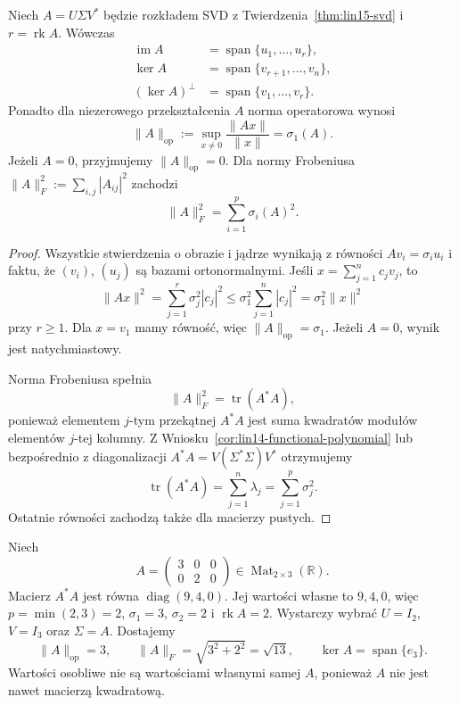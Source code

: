 \begin{stwierdzenie}
\label{prop:lin15-svd-rank}
Niech \(A=U\Sigma V^*\)
będzie rozkładem SVD
z
Twierdzenia~\ref{thm:lin15-svd}
i \(r=\operatorname{rk}A\).
Wówczas
\[
 \begin{aligned}
 \operatorname{im}A
   &=\operatorname{span}\{u_1,\ldots,u_r\},\\
 \ker A
   &=\operatorname{span}\{v_{r+1},\ldots,v_n\},\\
 (\ker A)^\perp
   &=\operatorname{span}\{v_1,\ldots,v_r\}.
 \end{aligned}
\]
Ponadto dla niezerowego
przekształcenia \(A\) norma
operatorowa wynosi
\[
 \|A\|_{\mathrm{op}}
 :=\sup_{x\ne0}\frac{\|Ax\|}{\|x\|}
 =\sigma_1(A).
\]
Jeżeli \(A=0\), przyjmujemy
\(\|A\|_{\mathrm{op}}=0\).
Dla normy Frobeniusa
\(\|A\|_F^2:=\sum_{i,j}|A_{ij}|^2\)
zachodzi
\[
 \|A\|_F^2
 =\sum_{i=1}^p\sigma_i(A)^2.
\]
\end{stwierdzenie}
\begin{proof}
Wszystkie stwierdzenia
o obrazie i jądrze wynikają
z równości \(Av_i=\sigma_i u_i\)
i faktu, że \((v_i)\),
\((u_j)\) są bazami ortonormalnymi.
Jeśli \(x=\sum_{j=1}^n c_jv_j\),
to
\[
 \|Ax\|^2
 =\sum_{j=1}^{r}\sigma_j^2|c_j|^2
 \le\sigma_1^2\sum_{j=1}^{n}|c_j|^2
 =\sigma_1^2\|x\|^2
\]
przy \(r\ge1\).
Dla \(x=v_1\) mamy równość,
więc \(\|A\|_{\mathrm{op}}=\sigma_1\).
Jeżeli \(A=0\), wynik
jest natychmiastowy.

Norma Frobeniusa spełnia
\[
 \|A\|_F^2
 =\operatorname{tr}(A^*A),
\]
ponieważ elementem \(j\)-tym
przekątnej \(A^*A\)
jest suma kwadratów modułów
elementów \(j\)-tej kolumny.
Z
Wniosku~\ref{cor:lin14-functional-polynomial}
lub bezpośrednio z diagonalizacji
\(A^*A=V(\Sigma^*\Sigma)V^*\)
otrzymujemy
\[
 \operatorname{tr}(A^*A)
 =\sum_{j=1}^{n}\lambda_j
 =\sum_{j=1}^{p}\sigma_j^2.
\]
Ostatnie równości zachodzą
także dla macierzy pustych.
\end{proof}

\begin{przyklad}
\label{prz:lin15-svd}
Niech
\[
 A=\begin{pmatrix}3&0&0\\0&2&0\end{pmatrix}
 \in\operatorname{Mat}_{2\times3}(\mathbb R).
\]
Macierz \(A^*A\) jest równa
\(\operatorname{diag}(9,4,0)\).
Jej wartości własne to \(9,4,0\),
więc \(p=\min(2,3)=2\),
\(\sigma_1=3\), \(\sigma_2=2\)
i \(\operatorname{rk}A=2\).
Wystarczy wybrać
\(U=I_2\), \(V=I_3\)
oraz \(\Sigma=A\).
Dostajemy
\[
 \|A\|_{\mathrm{op}}=3,\qquad
 \|A\|_F=\sqrt{3^2+2^2}=\sqrt{13},
 \qquad
 \ker A=\operatorname{span}\{e_3\}.
\]
Wartości osobliwe nie są
wartościami własnymi samej \(A\),
ponieważ \(A\) nie jest
nawet macierzą kwadratową.
\end{przyklad}


